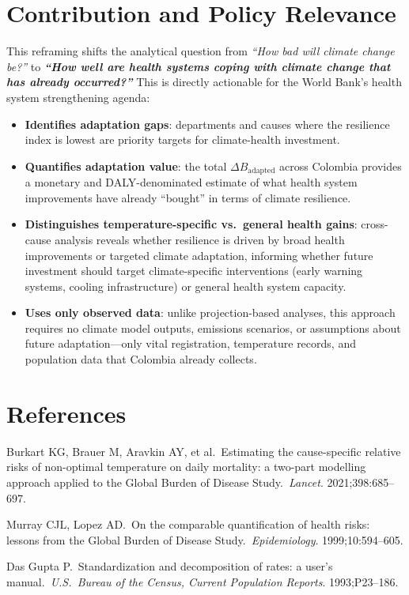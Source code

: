 \documentclass[11pt,a4paper]{article}
\begin{document}
\section{Contribution and Policy Relevance}

This reframing shifts the analytical question from \emph{``How bad will climate change be?''} to \textbf{\emph{``How well are health systems coping with climate change that has already occurred?''}} This is directly actionable for the World Bank's health system strengthening agenda:

\begin{itemize}[nosep]
  \item \textbf{Identifies adaptation gaps}: departments and causes where the resilience index is lowest are priority targets for climate-health investment.
  \item \textbf{Quantifies adaptation value}: the total $\Delta B_{\text{adapted}}$ across Colombia provides a monetary and DALY-denominated estimate of what health system improvements have already ``bought'' in terms of climate resilience.
  \item \textbf{Distinguishes temperature-specific vs.\ general health gains}: cross-cause analysis reveals whether resilience is driven by broad health improvements or targeted climate adaptation, informing whether future investment should target climate-specific interventions (early warning systems, cooling infrastructure) or general health system capacity.
  \item \textbf{Uses only observed data}: unlike projection-based analyses, this approach requires no climate model outputs, emissions scenarios, or assumptions about future adaptation---only vital registration, temperature records, and population data that Colombia already collects.
\end{itemize}

\section*{References}

\begin{enumerate}[nosep, label={[\arabic*]}]
  \item Burkart KG, Brauer M, Aravkin AY, et al.\ Estimating the cause-specific relative risks of non-optimal temperature on daily mortality: a two-part modelling approach applied to the Global Burden of Disease Study.\ \textit{Lancet}. 2021;398:685--697.
  \item Murray CJL, Lopez AD.\ On the comparable quantification of health risks: lessons from the Global Burden of Disease Study.\ \textit{Epidemiology}. 1999;10:594--605.
  \item Das Gupta P.\ Standardization and decomposition of rates: a user's manual.\ \textit{U.S.\ Bureau of the Census, Current Population Reports}. 1993;P23--186.
\end{enumerate}
\end{document}
